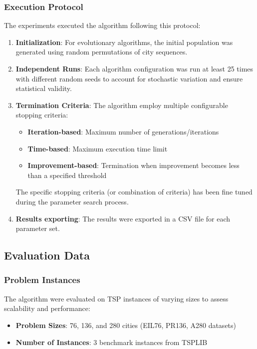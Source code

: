 \documentclass{scrartcl}
\begin{document}
\subsubsection{Execution Protocol}
The experiments executed the algorithm following this protocol:
\begin{enumerate}
    \item \textbf{Initialization}: For evolutionary algorithms, the initial population was generated using random permutations of city sequences.  
    \item \textbf{Independent Runs}: Each algorithm configuration was run at least 25 times with different random seeds to account for stochastic variation and ensure statistical validity.
    \item \textbf{Termination Criteria}: The algorithm employ multiple configurable stopping criteria:
    \begin{itemize}
        \item \textbf{Iteration-based}: Maximum number of generations/iterations
        \item \textbf{Time-based}: Maximum execution time limit
        \item \textbf{Improvement-based}: Termination when improvement becomes less than a specified threshold
    \end{itemize}
    The specific stopping criteria (or combination of criteria) has been fine tuned during the parameter search process.
    \item \textbf{Results exporting}: The results were exported in a CSV file for each parameter set.
\end{enumerate}

\subsection{Evaluation Data}

\subsubsection{Problem Instances}
The algorithm were evaluated on TSP instances of varying sizes to assess scalability and performance:
\begin{itemize}
    \item \textbf{Problem Sizes}: 76, 136, and 280 cities (EIL76, PR136, A280 datasets)
    \item \textbf{Number of Instances}: 3 benchmark instances from TSPLIB
\end{itemize}
\end{document}
